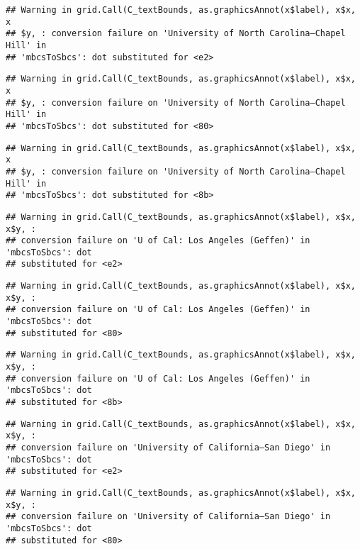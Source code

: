 \documentclass[]{article}
\begin{document}
\begin{verbatim}
## Warning in grid.Call(C_textBounds, as.graphicsAnnot(x$label), x$x, x
## $y, : conversion failure on 'University of North Carolina—​Chapel Hill' in
## 'mbcsToSbcs': dot substituted for <e2>
\end{verbatim}

\begin{verbatim}
## Warning in grid.Call(C_textBounds, as.graphicsAnnot(x$label), x$x, x
## $y, : conversion failure on 'University of North Carolina—​Chapel Hill' in
## 'mbcsToSbcs': dot substituted for <80>
\end{verbatim}

\begin{verbatim}
## Warning in grid.Call(C_textBounds, as.graphicsAnnot(x$label), x$x, x
## $y, : conversion failure on 'University of North Carolina—​Chapel Hill' in
## 'mbcsToSbcs': dot substituted for <8b>
\end{verbatim}

\begin{verbatim}
## Warning in grid.Call(C_textBounds, as.graphicsAnnot(x$label), x$x, x$y, :
## conversion failure on 'U of Cal: ​Los Angeles (Geffen)' in 'mbcsToSbcs': dot
## substituted for <e2>
\end{verbatim}

\begin{verbatim}
## Warning in grid.Call(C_textBounds, as.graphicsAnnot(x$label), x$x, x$y, :
## conversion failure on 'U of Cal: ​Los Angeles (Geffen)' in 'mbcsToSbcs': dot
## substituted for <80>
\end{verbatim}

\begin{verbatim}
## Warning in grid.Call(C_textBounds, as.graphicsAnnot(x$label), x$x, x$y, :
## conversion failure on 'U of Cal: ​Los Angeles (Geffen)' in 'mbcsToSbcs': dot
## substituted for <8b>
\end{verbatim}

\begin{verbatim}
## Warning in grid.Call(C_textBounds, as.graphicsAnnot(x$label), x$x, x$y, :
## conversion failure on 'University of California—​San Diego' in 'mbcsToSbcs': dot
## substituted for <e2>
\end{verbatim}

\begin{verbatim}
## Warning in grid.Call(C_textBounds, as.graphicsAnnot(x$label), x$x, x$y, :
## conversion failure on 'University of California—​San Diego' in 'mbcsToSbcs': dot
## substituted for <80>
\end{verbatim}
\end{document}
